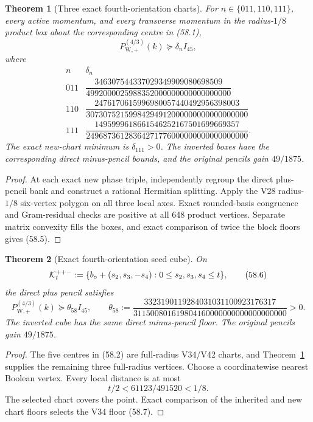 \documentclass[11pt,oneside]{article}
\newtheorem{theorem}{Theorem}[section]
\theoremstyle{definition}
\theoremstyle{remark}
\begin{document}
\begin{theorem}[Three exact fourth-orientation charts]
\label{thm:newv58-three-charts}
For \(n\in\{011,110,111\}\), every active momentum, and every
transverse momentum in the radius-\(1/8\) product box about the
corresponding centre in (58.1),
\[
 P_{\mathrm W,+}^{(4/3)}(k)\succeq\delta_n I_{45},    \tag{58.4}
\]
where
\[
\begin{array}{c|c}
n&\delta_n\\ \hline
011&\dfrac{346307544337029349909080698509}
{4992000025988352000000000000000000}\\[5pt]
110&\dfrac{2476170615996980057440492956398003}
{30730752159984294912000000000000000000}\\[5pt]
111&\dfrac{1495999618661546252167501699669357}
{24968736128364271776000000000000000000}.
\end{array}                                             \tag{58.5}
\]
The exact new-chart minimum is \(\delta_{111}>0\).  The inverted
boxes have the corresponding direct minus-pencil bounds, and the
original pencils gain \(49/1875\).
\end{theorem}

\begin{proof}
At each exact new phase triple, independently regroup the direct
plus-pencil bank and construct a rational Hermitian splitting.
Apply the V28 radius-\(1/8\) six-vertex polygon on all three local
axes.  Exact rounded-basis congruence and Gram-residual checks are
positive at all 648 product vertices.  Separate matrix convexity
fills the boxes, and exact comparison of twice the block floors
gives (58.5).
\end{proof}

\begin{theorem}[Exact fourth-orientation seed cube]
\label{thm:newv58-seed-cube}
On
\[
 {\cal K}^{++-}_t:=
 \{b_\circ+(s_2,s_3,-s_4):0\le s_2,s_3,s_4\le t\},   \tag{58.6}
\]
the direct plus pencil satisfies
\[
 P_{\mathrm W,+}^{(4/3)}(k)
 \succeq\theta_{58}I_{45},\qquad
 \theta_{58}:=
 \frac{3323190119284031031100923176317}
 {311500801619804160000000000000000000}>0.             \tag{58.7}
\]
The inverted cube has the same direct minus-pencil floor.  The
original pencils gain \(49/1875\).
\end{theorem}

\begin{proof}
The five centres in (58.2) are full-radius V34/V42 charts, and
Theorem~\ref{thm:newv58-three-charts} supplies the remaining three
full-radius vertices.  Choose a coordinatewise nearest Boolean
vertex.  Every local distance is at most
\[
 t/2<61123/491520<1/8.                               \tag{58.8}
\]
The selected chart covers the point.  Exact comparison of the
inherited and new chart floors selects the V34 floor (58.7).
\end{proof}
\end{document}
